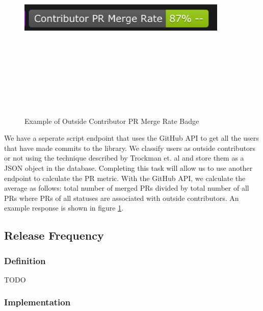 \documentclass[12pt, letterpaper]{article}
\begin{document}
\begin{figure}[!htb]
    \centerline{
        \includegraphics[width=10cm,height=10cm,keepaspectratio=true]{prbadge}
    }
    \caption{
        Example of Outside Contributor PR Merge Rate Badge 
    }
    \label{prbadge}
\end{figure}

We have a seperate script endpoint that uses the GitHub \cite{github} API to get all the users
that have made commits to the library. We classify users as outside contributors or not using
the technique described by Trockman et. al \cite{githubbadges} and store them as a JSON object in the database.
Completing this task will allow us to use another endpoint to calculate the PR metric.
With the GitHub \cite{github} API, we calculate
the average as follows: total number of merged PRs divided by total number of all PRs where 
PRs of all statuses are associated with outside contributors. An example response is shown in figure \ref{prbadge}.


\subsection{Release Frequency}
\subsubsection{Definition}
TODO

\subsubsection{Implementation}
\end{document}
